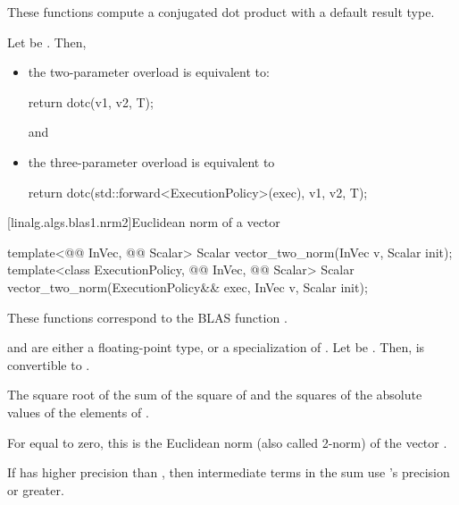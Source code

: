 \begin{itemdescr}

\pnum
These functions compute a conjugated dot product with a default result type.

\pnum
\effects
Let  be .
Then,
\begin{itemize}
\item
the two-parameter overload is equivalent to:
\begin{codeblock}
return dotc(v1, v2, T{});
\end{codeblock}
and
\item
the three-parameter overload is equivalent to
\begin{codeblock}
return dotc(std::forward<ExecutionPolicy>(exec), v1, v2, T{});
\end{codeblock}
\end{itemize}
\end{itemdescr}

[linalg.algs.blas1.nrm2]{Euclidean norm of a vector}

%
\begin{itemdecl}
template<@@ InVec, @@ Scalar>
  Scalar vector_two_norm(InVec v, Scalar init);
template<class ExecutionPolicy, @@ InVec, @@ Scalar>
  Scalar vector_two_norm(ExecutionPolicy&& exec, InVec v, Scalar init);
\end{itemdecl}

\begin{itemdescr}
\pnum
\begin{note}
These functions correspond to the BLAS function \supercite{blas1}.
\end{note}

\pnum
\mandates
{} and  are either a floating-point type, or
a specialization of .
Let  be
.
Then,  is convertible to .

\pnum
\returns
The square root of the sum of the square of  and the squares of the absolute values of the elements of .
\begin{note}
For  equal to zero, this is the Euclidean norm
(also called 2-norm) of the vector .
\end{note}

\pnum
\remarks
If  has higher precision
than ,
then intermediate terms in the sum use 's precision or greater.
\end{itemdescr}

